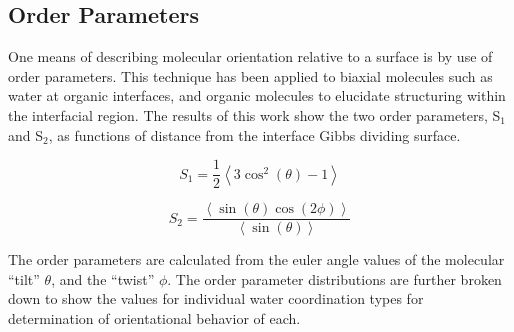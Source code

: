 \subsection{Order Parameters}
One means of describing molecular orientation relative to a surface is by use of order parameters.\cite{Buffeteau2004} This technique has been applied to biaxial molecules such as water at organic interfaces,\cite{Hore2008} and organic molecules to elucidate structuring within the interfacial region.\cite{Hore2007} The results of this work show the two order parameters, S$_1$ and S$_2$, as functions of distance from the interface Gibbs dividing surface.

\begin{equation}\label{s1 parameter}
	S_1 = \frac12\left<3 \cos^2(\theta) - 1\right>
\end{equation}

\begin{equation}\label{s2 parameter}
	S_2 = \frac{\left<\sin(\theta)\cos(2\phi)\right>}{\left<\sin(\theta)\right>}
\end{equation}

The order parameters are calculated from the euler angle values of the molecular ``tilt'' $\theta$, and the ``twist'' $\phi$. The order parameter distributions are further broken down to show the values for individual water coordination types for determination of orientational behavior of each.
